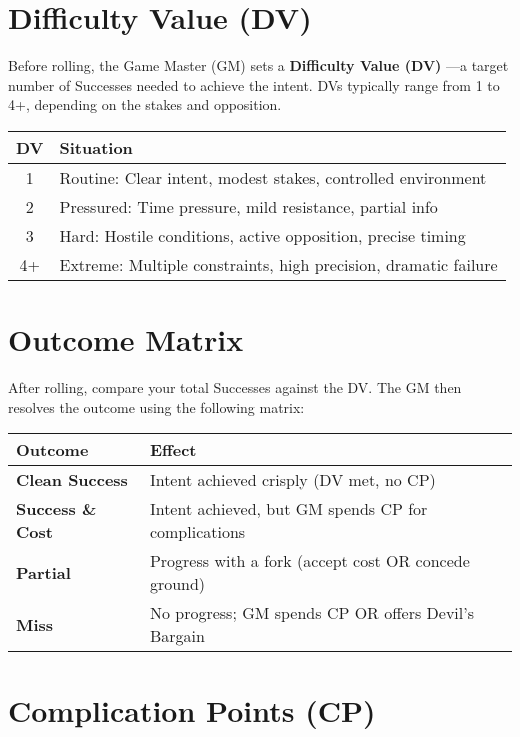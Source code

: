 \section{Difficulty Value (DV)}

Before rolling, the Game Master (GM) sets a \textbf{Difficulty Value (DV)} —a target number of Successes needed to achieve the intent. DVs typically range from 1 to 4+, depending on the stakes and opposition.

\begin{center}
\begin{tabular}{cl}
\toprule
\textbf{DV} & \textbf{Situation} \\
\midrule
1 & Routine: Clear intent, modest stakes, controlled environment \\
2 & Pressured: Time pressure, mild resistance, partial info \\
3 & Hard: Hostile conditions, active opposition, precise timing \\
4+ & Extreme: Multiple constraints, high precision, dramatic failure \\
\bottomrule
\end{tabular}
\end{center}

\section{Outcome Matrix}

After rolling, compare your total Successes against the DV. The GM then resolves the outcome using the following matrix:

\begin{center}
\begin{tabular}{ll}
\toprule
\textbf{Outcome} & \textbf{Effect} \\
\midrule
\textbf{Clean Success} & Intent achieved crisply (DV met, no CP) \\
\textbf{Success \& Cost} & Intent achieved, but GM spends CP for complications \\
\textbf{Partial} & Progress with a fork (accept cost OR concede ground) \\
\textbf{Miss} & No progress; GM spends CP OR offers Devil's Bargain \\
\bottomrule
\end{tabular}
\end{center}

\section{Complication Points (CP)}

